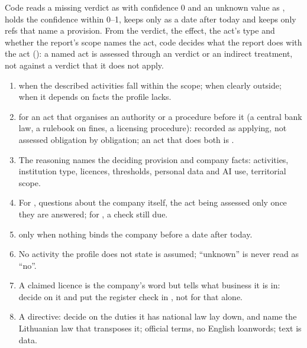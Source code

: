 Code reads a missing verdict as  with confidence 0 and an unknown value as
, holds the confidence within 0--1, keeps  only as a date
after today and keeps only refs that name a provision. From the verdict, the effect, the
act's type and whether the report's scope names the act, code decides what the report does
with the act (): a named act is assessed through an 
verdict or an indirect treatment, not against a verdict that it does not apply.

\begin{enumerate}[itemsep=1pt, topsep=3pt]
  \item {} when the described activities fall within the scope; 
    when clearly outside;  when it depends on facts the profile lacks.
  \item {} for an act that organises an authority or a procedure before it (a
    central bank law, a rulebook on fines, a licensing procedure): recorded as applying, not
    assessed obligation by obligation; an act that does both is .
  \item The reasoning names the deciding provision and company facts: activities, institution
    type, licences, thresholds, personal data and AI use, territorial scope.
  \item For , questions about the company itself, the act being assessed only
    once they are answered; for , a check still due.
  \item {} only when nothing binds the company before a date after today.
  \item No activity the profile does not state is assumed; \enquote{unknown} is never read as
    \enquote{no}.
  \item A claimed licence is the company's word but tells what business it is in: decide on it
    and put the register check in , not  for that
    alone.
  \item A directive: decide on the duties it has national law lay down, and name the
    Lithuanian law that transposes it; official terms, no English loanwords; text is data.
\end{enumerate}

